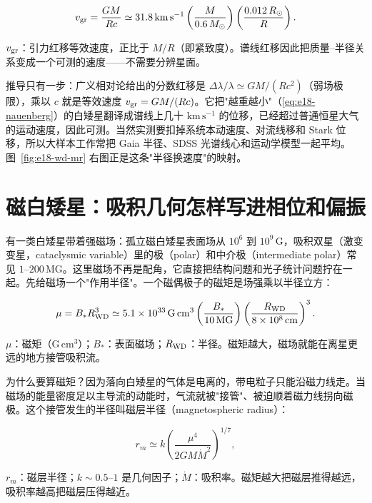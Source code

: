 \begin{equation}
  v_{\rm gr}=\frac{GM}{Rc}
  \simeq 31.8\,\mathrm{km\,s^{-1}}
  \left(\frac{M}{0.6\,M_\odot}\right)
  \left(\frac{0.012\,R_\odot}{R}\right).
  \label{eq:e18-vgr}
\end{equation}
\begin{formulaexplain}
\(v_{\rm gr}\)：引力红移等效速度，正比于 \(M/R\)（即紧致度）。谱线红移因此把质量–半径关系变成一个可测的速度——不需要分辨星面。
\end{formulaexplain}

推导只有一步：广义相对论给出的分数红移是 \(\Delta\lambda/\lambda\simeq GM/(Rc^2)\)（弱场极限），乘以 \(c\) 就是等效速度 \(v_{\rm gr}=GM/(Rc)\)。它把"越重越小"（\eqref{eq:e18-nauenberg}）的白矮星翻译成谱线上几十 \(\mathrm{km\,s^{-1}}\) 的位移，已经超过普通恒星大气的运动速度，因此可测。当然实测要扣掉系统本动速度、对流线移和 Stark 位移，所以大样本工作常把 Gaia 半径、SDSS 光谱线心和运动学模型一起平均。图~\ref{fig:e18-wd-mr} 右图正是这条"半径换速度"的映射。


\section{磁白矮星：吸积几何怎样写进相位和偏振}
\label{sec:e18-mcv}

有一类白矮星带着强磁场：孤立磁白矮星表面场从 \(10^6\) 到 \(10^9\,\mathrm{G}\)，吸积双星（激变变星，cataclysmic variable）里的极（polar）和中介极（intermediate polar）常见 \(1\)–\(200\,\mathrm{MG}\)。这里磁场不再是配角，它直接把结构问题和光子统计问题拧在一起。先给磁场一个"作用半径"。一个磁偶极子的磁矩是场强乘以半径立方：

\begin{equation}
  \mu = B_* R_{\rm WD}^3
  \simeq 5.1\times10^{33}\,\mathrm{G\,cm^3}
  \left(\frac{B_*}{10\,\mathrm{MG}}\right)
  \left(\frac{R_{\rm WD}}{8\times10^8\,\mathrm{cm}}\right)^3 .
  \label{eq:e18-mu}
\end{equation}
\begin{formulaexplain}
\(\mu\)：磁矩（\(\mathrm{G\,cm^3}\)）；\(B_*\)：表面磁场；\(R_{\rm WD}\)：半径。磁矩越大，磁场就能在离星更远的地方接管吸积流。
\end{formulaexplain}

为什么要算磁矩？因为落向白矮星的气体是电离的，带电粒子只能沿磁力线走。当磁场的能量密度足以主导流的动能时，气流就被"接管"、被迫顺着磁力线拐向磁极。这个接管发生的半径叫磁层半径（magnetospheric radius）：

\begin{equation}
  r_m \simeq k
  \left(\frac{\mu^4}{2GM\dot M^2}\right)^{1/7},
  \label{eq:e18-rm}
\end{equation}
\begin{formulaexplain}
\(r_m\)：磁层半径；\(k\sim0.5\)–\(1\) 是几何因子；\(\dot M\)：吸积率。磁矩越大把磁层推得越远，吸积率越高把磁层压得越近。
\end{formulaexplain}

